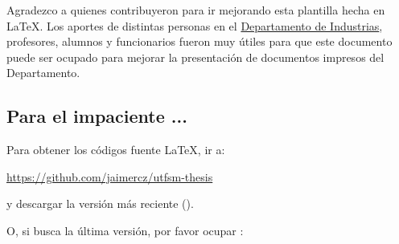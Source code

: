 
	Agradezco a quienes contribuyeron para ir mejorando esta plantilla hecha en \LaTeX{}. Los aportes de distintas personas en el \href{http://www.industrias.usm.cl}{Departamento de Industrias}, profesores, alumnos y funcionarios fueron muy útiles para que este documento puede ser ocupado para mejorar la presentación de documentos impresos del Departamento.

\subsection*{\color{red}Para el impaciente ...}

Para obtener los códigos fuente \LaTeX{}, ir a:
	
	\url{https://github.com/jaimercz/utfsm-thesis}
	
y descargar la versión más reciente ().
    
O, si busca la última versión, por favor ocupar :
	

